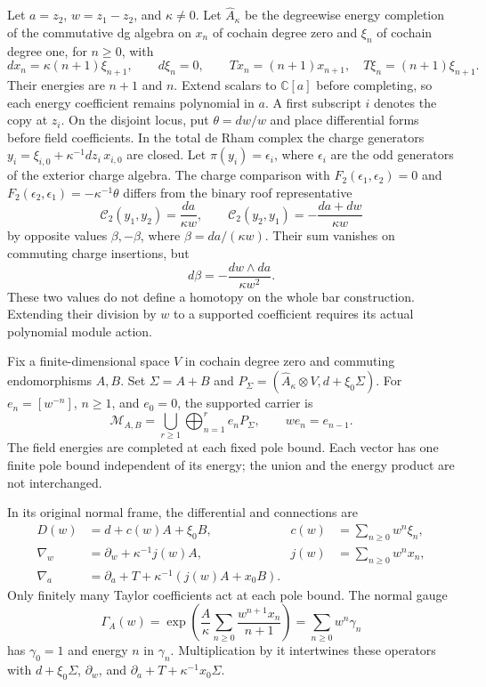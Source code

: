 Let $a=z_2$, $w=z_1-z_2$, and $\kappa\ne0$.
Let $\widehat A_\kappa$ be the degreewise energy completion of the
commutative dg algebra on $x_n$ of cochain degree zero and $\xi_n$
of cochain degree one, for $n\geq0$, with
\[
 dx_n=\kappa(n+1)\xi_{n+1},\qquad d\xi_n=0,
 \qquad Tx_n=(n+1)x_{n+1},\quad T\xi_n=(n+1)\xi_{n+1}.
\]
Their energies are $n+1$ and $n$.  Extend scalars to $\mathbb C[a]$
before completing, so each energy coefficient remains polynomial in
$a$.  A first subscript $i$ denotes the copy at $z_i$.
On the disjoint locus, put $\theta=dw/w$ and place differential
forms before field coefficients.  In the total de Rham complex the
charge generators $y_i=\xi_{i,0}+\kappa^{-1}dz_i\,x_{i,0}$ are closed.
Let $\pi(y_i)=\epsilon_i$, where $\epsilon_i$ are the odd generators
of the exterior charge algebra.
The charge comparison with
$F_2(\epsilon_1,\epsilon_2)=0$ and
$F_2(\epsilon_2,\epsilon_1)=-\kappa^{-1}\theta$
differs from the binary roof representative
\[
 \mathcal C_2(y_1,y_2)=\frac{da}{\kappa w},\qquad
 \mathcal C_2(y_2,y_1)=-\frac{da+dw}{\kappa w}
\]
by opposite values $\beta,-\beta$, where $\beta=da/(\kappa w)$.
Their sum vanishes on commuting charge insertions, but
\[
 d\beta=-\frac{dw\wedge da}{\kappa w^2}.
\]
These two values do not define a homotopy on the whole bar construction.
Extending their division by $w$ to a supported coefficient requires
its actual polynomial module action.

Fix a finite-dimensional space $V$ in cochain degree zero and commuting endomorphisms
$A,B$.  Set $\Sigma=A+B$ and
$P_\Sigma=(\widehat A_\kappa\otimes V,d+\xi_0\Sigma)$.
For $e_n=[w^{-n}]$, $n\geq1$, and $e_0=0$, the supported carrier is
\begin{equation}\label{cyquant:eq:supported-carrier}
 \mathcal M_{A,B}=\bigcup_{r\geq1}\bigoplus_{n=1}^r e_nP_\Sigma,
 \qquad we_n=e_{n-1}.
\end{equation}
The field energies are completed at each fixed pole bound.  Each
vector has one finite pole bound independent of its energy; the
union and the energy product are not interchanged.

In its original normal frame, the differential and connections are
\[
 \begin{aligned}
 D(w)&=d+c(w)A+\xi_0B,&c(w)&=\sum_{n\geq0}w^n\xi_n,\\
 \nabla_w&=\partial_w+\kappa^{-1}j(w)A,&j(w)&=\sum_{n\geq0}w^nx_n,\\
 \nabla_a&=\partial_a+T+\kappa^{-1}(j(w)A+x_0B).
 \end{aligned}
\]
Only finitely many Taylor coefficients act at each pole bound.
The normal gauge
\begin{equation}\label{cyquant:eq:normal-gauge}
 \Gamma_A(w)=\exp\left(\frac A\kappa
                  \sum_{n\geq0}\frac{w^{n+1}x_n}{n+1}\right)
            =\sum_{n\geq0}w^n\gamma_n
\end{equation}
has $\gamma_0=1$ and energy $n$ in $\gamma_n$.
Multiplication by it intertwines these operators with
$d+\xi_0\Sigma$, $\partial_w$, and
$\partial_a+T+\kappa^{-1}x_0\Sigma$.

